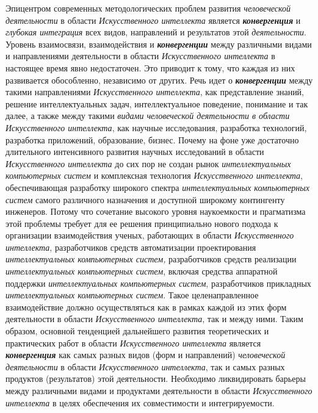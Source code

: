 Эпицентром современных методологических проблем развития \textit{человеческой} \textit{деятельности} в области \textit{Искусственного интеллекта} является \textbf{\textit{конвергенция}} и \textit{глубокая интеграция} всех видов, направлений и результатов этой \textit{деятельности}. Уровень взаимосвязи, взаимодействия и \textbf{\textit{конвергенции}} между различными видами и направлениями деятельности в области \textit{Искусственного интеллекта} в настоящее время явно недостаточен. Это приводит к тому, что каждая из них развивается обособленно, независимо от других. Речь идет о \textbf{\textit{конвергенции}} между такими направлениями \textit{Искусственного интеллекта}, как представление знаний, решение интеллектуальных задач, интеллектуальное поведение, понимание и так далее, а также между такими \textit{видами человеческой деятельности в области Искусственного интеллекта}, как научные исследования, разработка технологий, разработка приложений, образование, бизнес. Почему на фоне уже достаточно длительного интенсивного развития научных исследований в области \textit{Искусственного интеллекта} до сих пор не создан рынок \textit{интеллектуальных компьютерных систем} и комплексная технология \textit{Искусственного интеллекта}, обеспечивающая разработку широкого спектра \textit{интеллектуальных компьютерных систем} самого различного назначения и доступной широкому контингенту инженеров. Потому что сочетание высокого уровня наукоемкости и прагматизма этой проблемы требует для ее решения принципиально нового подхода к организации взаимодействия ученых, работающих в области \textit{Искусственного интеллекта}, разработчиков средств автоматизации проектирования \textit{интеллектуальных компьютерных систем,} разработчиков средств реализации \textit{интеллектуальных компьютерных систем}, включая средства аппаратной поддержки \textit{интеллектуальных компьютерных систем}, разработчиков прикладных \textit{интеллектуальных компьютерных систем}. Такое целенаправленное взаимодействие должно осуществляться как в рамках каждой из этих форм деятельности в области \textit{Искусственного интеллекта}, так и между ними. Таким образом, основной тенденцией дальнейшего развития теоретических и практических работ в области \textit{Искусственного интеллекта} является \textbf{\textit{конвергенция}} как самых разных видов (форм и направлений) \textit{человеческой деятельности} в области \textit{Искусственного интеллекта}, так и самых разных продуктов (результатов) этой деятельности. Необходимо ликвидировать барьеры между различными видами и продуктами деятельности в области \textit{Искусственного интеллекта} в целях обеспечения их совместимости и интегрируемости.

